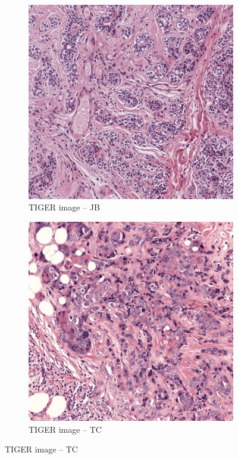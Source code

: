 \begin{figure}[H]
  \centering
  \begin{subfigure}[b]{0.32\textwidth}
    \centering
    \includegraphics[width=\linewidth]{assets/images/for_presentation/norm_100B_[10779, 11621, 12102, 12874].png}
    \caption{TIGER image – JB}
    \label{fig:tiger-jb}
  \end{subfigure}\quad
  \begin{subfigure}[b]{0.32\textwidth}
    \centering
    \includegraphics[width=\linewidth]{assets/images/for_presentation/norm_TC_S01_P000003_C0001_B104_[50106, 52730, 51199, 53794].png}
    \caption{TIGER image – TC}
    \label{fig:tiger-tc}
  \end{subfigure}


\end{figure}
